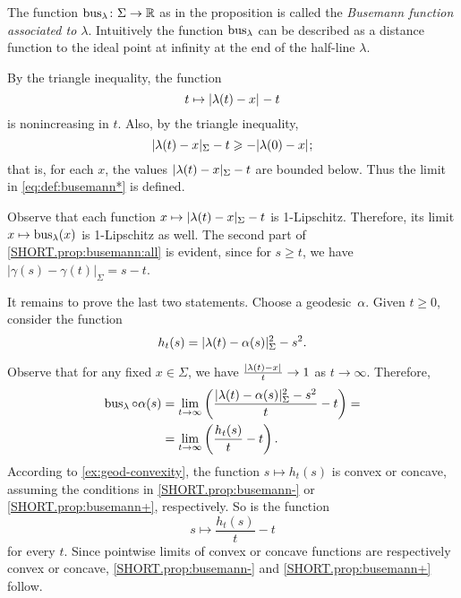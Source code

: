 The function $\bus_\lambda\:\Sigma\z\to \mathbb{R}$ as in the proposition is called the
\emph{Busemann function associated to $\lambda$}.
Intuitively the function $\mathop{\rm bus}\nolimits_\lambda$ can be described as a distance function to the ideal point at infinity at the end of the half-line $\lambda$.

By the triangle inequality, the function 
\[t\mapsto\dist{\lambda(t)}{x}{}- t\] is nonincreasing in $t$. 
Also, by the triangle inequality,
\[\dist{\lambda(t)}{x}{\Sigma}- t\ge-\dist{\lambda(0)}{x}{};\]
that is, for each $x$, the values $\dist{\lambda(t)}{x}{\Sigma}- t$ are bounded below.
Thus the limit in \ref{eq:def:busemann*} is defined.

Observe that each function $x\mapsto \dist{\lambda(t)}{x}{\Sigma}- t$ is 1-Lipschitz.
Therefore, its limit $x\mapsto\mathop{\rm bus}\nolimits_\lambda(x)$ is 1-Lipschitz as well.
The second part of \ref{SHORT.prop:busemann:all} is evident, since for $s \geq t$, we have $| \gamma (s) - \gamma (t) |_{\Sigma} = s-t$.

It remains to prove the last two statements.
Choose a geodesic~$\alpha$.
Given $t\ge 0$, consider the function 
\[h_t(s)=\dist{\lambda(t)}{\alpha(s)}{\Sigma}^2-s^2.\]

Observe that for any fixed $x\in\Sigma$, we have $\tfrac{\dist{\lambda(t)}{x}{}}t\to 1$ as $t\to\infty$.
Therefore,
\begin{align*}
\mathop{\rm bus}\nolimits_\lambda\circ\alpha(s)
&=
\lim_{t\to\infty}\left(\frac{| \lambda (t) - \alpha (s) |_{\Sigma}^2 - s^2 }{t} -t\right)=
\\
&=
\lim_{t\to\infty}\left(\frac{h_t(s)}{t} -t\right).
\end{align*}
According to \ref{ex:geod-convexity}, the function 
$s\mapsto h_t(s)$ is convex or concave, assuming the conditions in \ref{SHORT.prop:busemann-} or \ref{SHORT.prop:busemann+}, respectively.
So is the function
\[s \mapsto \frac{h_t(s)}{t} -t \]
for every $t$.
Since pointwise limits of convex or concave functions are respectively convex or concave, \ref{SHORT.prop:busemann-} and \ref{SHORT.prop:busemann+} follow.
\qeds

